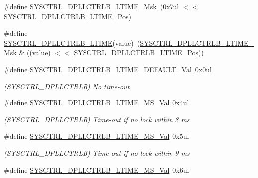 \begin{DoxyCompactItemize}
\#define \mbox{\hyperlink{group___s_a_m_d21___s_y_s_c_t_r_l_gae27c5423444c89dc83af4ade0ce2fe02}{S\+Y\+S\+C\+T\+R\+L\+\_\+\+D\+P\+L\+L\+C\+T\+R\+L\+B\+\_\+\+L\+T\+I\+M\+E\+\_\+\+Msk}}~(0x7ul $<$$<$ S\+Y\+S\+C\+T\+R\+L\+\_\+\+D\+P\+L\+L\+C\+T\+R\+L\+B\+\_\+\+L\+T\+I\+M\+E\+\_\+\+Pos)
\item 
\#define \mbox{\hyperlink{group___s_a_m_d21___s_y_s_c_t_r_l_ga0656abcdfcc48d991f1307293497af6a}{S\+Y\+S\+C\+T\+R\+L\+\_\+\+D\+P\+L\+L\+C\+T\+R\+L\+B\+\_\+\+L\+T\+I\+ME}}(value)~(\mbox{\hyperlink{group___s_a_m_d21___s_y_s_c_t_r_l_gae27c5423444c89dc83af4ade0ce2fe02}{S\+Y\+S\+C\+T\+R\+L\+\_\+\+D\+P\+L\+L\+C\+T\+R\+L\+B\+\_\+\+L\+T\+I\+M\+E\+\_\+\+Msk}} \& ((value) $<$$<$ \mbox{\hyperlink{group___s_a_m_d21___s_y_s_c_t_r_l_ga906665610facc5bdb428c5b237c15df5}{S\+Y\+S\+C\+T\+R\+L\+\_\+\+D\+P\+L\+L\+C\+T\+R\+L\+B\+\_\+\+L\+T\+I\+M\+E\+\_\+\+Pos}}))
\item 
\#define \mbox{\hyperlink{group___s_a_m_d21___s_y_s_c_t_r_l_gae5f144f6fd5480d44176047d6bc6b32b}{S\+Y\+S\+C\+T\+R\+L\+\_\+\+D\+P\+L\+L\+C\+T\+R\+L\+B\+\_\+\+L\+T\+I\+M\+E\+\_\+\+D\+E\+F\+A\+U\+L\+T\+\_\+\+Val}}~0x0ul
\begin{DoxyCompactList}\small\item\em (S\+Y\+S\+C\+T\+R\+L\+\_\+\+D\+P\+L\+L\+C\+T\+R\+LB) No time-\/out \end{DoxyCompactList}\item 
\#define \mbox{\hyperlink{group___s_a_m_d21___s_y_s_c_t_r_l_ga3bfd9406004834e15e599a252dc43e45}{S\+Y\+S\+C\+T\+R\+L\+\_\+\+D\+P\+L\+L\+C\+T\+R\+L\+B\+\_\+\+L\+T\+I\+M\+E\+\_\+M\+S\+\_\+\+Val}}~0x4ul
\begin{DoxyCompactList}\small\item\em (S\+Y\+S\+C\+T\+R\+L\+\_\+\+D\+P\+L\+L\+C\+T\+R\+LB) Time-\/out if no lock within 8 ms \end{DoxyCompactList}\item 
\#define \mbox{\hyperlink{group___s_a_m_d21___s_y_s_c_t_r_l_gaba799a6835775b1c2a20cd1e4087d582}{S\+Y\+S\+C\+T\+R\+L\+\_\+\+D\+P\+L\+L\+C\+T\+R\+L\+B\+\_\+\+L\+T\+I\+M\+E\+\_\+M\+S\+\_\+\+Val}}~0x5ul
\begin{DoxyCompactList}\small\item\em (S\+Y\+S\+C\+T\+R\+L\+\_\+\+D\+P\+L\+L\+C\+T\+R\+LB) Time-\/out if no lock within 9 ms \end{DoxyCompactList}\item 
\#define \mbox{\hyperlink{group___s_a_m_d21___s_y_s_c_t_r_l_gac745efb1fbd339720d83a2b7422d54f8}{S\+Y\+S\+C\+T\+R\+L\+\_\+\+D\+P\+L\+L\+C\+T\+R\+L\+B\+\_\+\+L\+T\+I\+M\+E\+\_\+M\+S\+\_\+\+Val}}~0x6ul

\end{DoxyCompactItemize}
